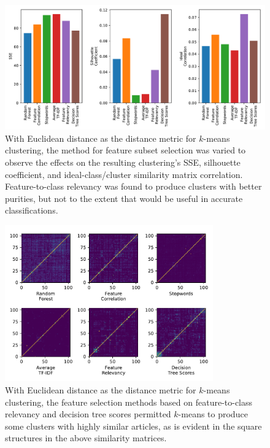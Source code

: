 \documentclass[11pt]{article}
\begin{document}

\begin{figure} \label{fig:something}
  \centering
  \includegraphics[height=0.3\textheight]{figures/hw3/euclidean/feature_subset_selection}
  \caption{With Euclidean distance as the distance metric for $k$-means clustering, the method for feature subset selection was varied to observe the effects on the resulting clustering's SSE, silhouette coefficient, and ideal-class/cluster similarity matrix correlation.
  Feature-to-class relevancy was found to produce clusters with better purities, but not to the extent that would be useful in accurate classifications.}
\end{figure}

\begin{figure} \label{fig:something}
  \centering
  \includegraphics[width=0.8\textwidth]{figures/hw3/euclidean/similarity_matrices}
  \caption{With Euclidean distance as the distance metric for $k$-means clustering, the feature selection methods based on feature-to-class relevancy and decision tree scores permitted $k$-means to produce some clusters with highly similar articles, as is evident in the square structures in the above similarity matrices.}
\end{figure}
\end{document}
